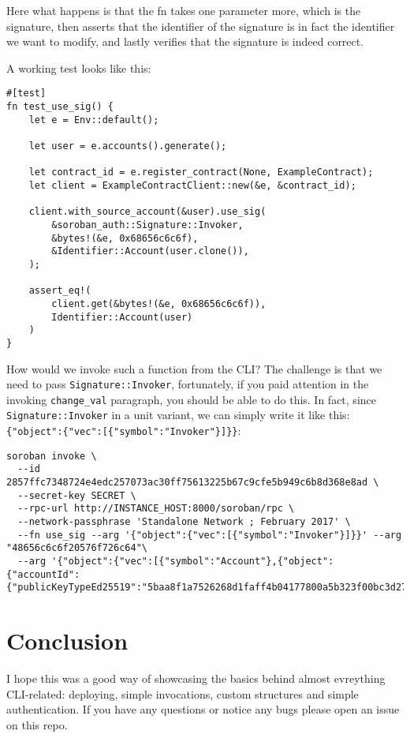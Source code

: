 \documentclass[10pt]{article}
\begin{document}
Here what happens is that the fn takes one parameter more, which is the signature, then asserts that the identifier of the signature is in fact the identifier we want to modify, and lastly verifies that the signature is indeed correct.

A working test looks like this:

\begin{verbatim}
#[test]
fn test_use_sig() {
    let e = Env::default();

    let user = e.accounts().generate();

    let contract_id = e.register_contract(None, ExampleContract);
    let client = ExampleContractClient::new(&e, &contract_id);

    client.with_source_account(&user).use_sig(
        &soroban_auth::Signature::Invoker,
        &bytes!(&e, 0x68656c6c6f),
        &Identifier::Account(user.clone()),
    );

    assert_eq!(
        client.get(&bytes!(&e, 0x68656c6c6f)),
        Identifier::Account(user)
    )
}
\end{verbatim}

How would we invoke such a function from the CLI? The challenge is that we need to pass \texttt{Signature::Invoker}, fortunately, if you paid attention in the invoking \texttt{change\_val} paragraph, you should be able to do this. In fact, since \texttt{Signature::Invoker} in a unit variant, we can simply write it like this: \texttt{\{"object":\{"vec":[\{"symbol":"Invoker"\}]\}\}}:

\begin{verbatim}
soroban invoke \
  --id 2857ffc7348724e4edc257073ac30ff75613225b67c9cfe5b949c6b8d368e8ad \
  --secret-key SECRET \
  --rpc-url http://INSTANCE_HOST:8000/soroban/rpc \
  --network-passphrase 'Standalone Network ; February 2017' \
  --fn use_sig --arg '{"object":{"vec":[{"symbol":"Invoker"}]}}' --arg "48656c6c6f20576f726c64"\
  --arg '{"object":{"vec":[{"symbol":"Account"},{"object":{"accountId":{"publicKeyTypeEd25519":"5baa8f1a7526268d1faff4b04177800a5b323f00bc3d27fb6c33833e10d0518d"}}}]}}'
\end{verbatim}

\section*{Conclusion}
I hope this was a good way of showcasing the basics behind almost evreything CLI-related: deploying, simple invocations, custom structures and  simple authentication. If you have any questions or notice any bugs please open an issue on this repo.
\end{document}
